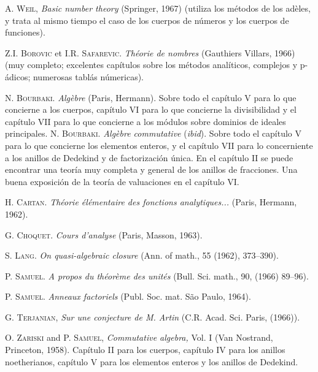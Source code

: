 \documentclass[10pt,oneside,bibtotoc,smallheadings,leqno,a5paper,DIV=12]{scrbook}
\numberwithin{equation}{section}
\theoremstyle{defi}
\theoremstyle{enonce}
\theoremstyle{rem}
\numberwithin{theorem}{section}
\numberwithin{proposition}{section}
\numberwithin{definition}{section}
\numberwithin{lemma}{section}
\numberwithin{corollary}{section}
\numberwithin{example}{section}
\numberwithin{footnote}{section}%
\begin{document}
\begin{thebibliography}{21}
\bibitem{} {\scshape A. Weil,} {\itshape Basic number theory} (Springer, 1967) (utiliza los m\'etodos
de los ad\`eles, y trata al mismo tiempo el caso de los cuerpos de n\'umeros y los cuerpos de funciones).

\bibitem{} {\scshape Z.I. Borovic} et {\scshape I.R. Safarevic.} {\itshape Th\'eorie de nombres}
(Gauthiers Villars, 1966)
(muy completo; excelentes cap\'itulos sobre los m\'etodos anal\'iticos, complejos y p-\'adicos; numerosas
tabl\'as n\'umericas).


 {\scshape N. Bourbaki.} {\itshape Alg\`ebre} (Paris, Hermann).
Sobre todo el cap\'itulo V para lo que concierne a los cuerpos,
cap\'itulo VI para lo que concierne la divisibilidad y el
cap\'itulo VII para lo que concierne a los m\'odulos sobre
dominios de ideales principales.
 {\scshape N. Bourbaki.} {\itshape Alg\`ebre commutative} (\textit{ibid}). Sobre todo el
cap\'itulo V para lo que concierne los elementos enteros, y el cap\'itulo VII para lo concerniente a los
anillos de Dedekind y de factorizaci\'on \'unica. En el cap\'itulo II se puede encontrar una teor\'ia muy
completa y general de los anillos de fracciones. Una buena exposici\'on de la teor\'ia de valuaciones en
el cap\'itulo VI.

 {\scshape H. Cartan.} {\itshape Th\'eorie \'el\'ementaire des fonctions analytiques...}
(Paris, Hermann, 1962).

 {\scshape G. Choquet.} {\itshape Cours d'analyse} (Paris, Masson, 1963).

 {\scshape S. Lang.} {\itshape On quasi-algebraic closure} (Ann. of math., 55 (1962), 373--390).

 {\scshape P. Samuel.} {\itshape A propos du th\'eor\`eme des unit\'es}
(Bull. Sci. math., 90, (1966) 89--96).

 {\scshape P. Samuel.} {\itshape Anneaux factoriels} (Publ. Soc. mat. S\~ao Paulo, 1964).

 {\scshape G. Terjanian,} {\itshape Sur une conjecture de M. Artin} (C.R. Acad. Sci. Paris,
(1966)).

 {\scshape O. Zariski} and {\scshape P. Samuel,} {\itshape Commutative algebra,} Vol. I
(Van Nostrand, Princeton, 1958). Cap\'itulo II para los cuerpos, cap\'itulo IV para los anillos noetherianos,
cap\'itulo V para los elementos enteros y los anillos de Dedekind.
\end{thebibliography}

\end{document}
